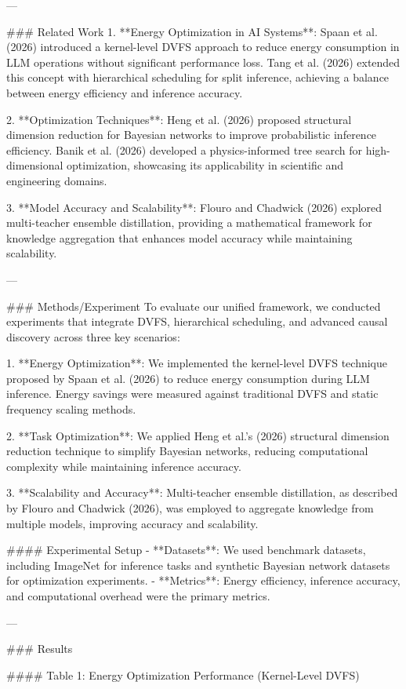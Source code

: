 ---

### Related Work  
1. **Energy Optimization in AI Systems**: Spaan et al. (2026) introduced a kernel-level DVFS approach to reduce energy consumption in LLM operations without significant performance loss. Tang et al. (2026) extended this concept with hierarchical scheduling for split inference, achieving a balance between energy efficiency and inference accuracy.

2. **Optimization Techniques**: Heng et al. (2026) proposed structural dimension reduction for Bayesian networks to improve probabilistic inference efficiency. Banik et al. (2026) developed a physics-informed tree search for high-dimensional optimization, showcasing its applicability in scientific and engineering domains.

3. **Model Accuracy and Scalability**: Flouro and Chadwick (2026) explored multi-teacher ensemble distillation, providing a mathematical framework for knowledge aggregation that enhances model accuracy while maintaining scalability.

---

### Methods/Experiment  
To evaluate our unified framework, we conducted experiments that integrate DVFS, hierarchical scheduling, and advanced causal discovery across three key scenarios:

1. **Energy Optimization**: We implemented the kernel-level DVFS technique proposed by Spaan et al. (2026) to reduce energy consumption during LLM inference. Energy savings were measured against traditional DVFS and static frequency scaling methods.

2. **Task Optimization**: We applied Heng et al.'s (2026) structural dimension reduction technique to simplify Bayesian networks, reducing computational complexity while maintaining inference accuracy.

3. **Scalability and Accuracy**: Multi-teacher ensemble distillation, as described by Flouro and Chadwick (2026), was employed to aggregate knowledge from multiple models, improving accuracy and scalability.

#### Experimental Setup  
- **Datasets**: We used benchmark datasets, including ImageNet for inference tasks and synthetic Bayesian network datasets for optimization experiments.  
- **Metrics**: Energy efficiency, inference accuracy, and computational overhead were the primary metrics.  

---

### Results  

#### Table 1: Energy Optimization Performance (Kernel-Level DVFS)

